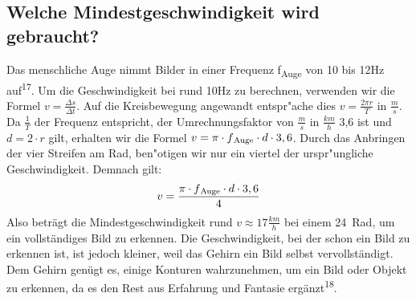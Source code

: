 \documentclass [a4paper, 11pt] {article}
\begin{document}
\subsection{Welche Mindestgeschwindigkeit wird gebraucht?}
Das menschliche Auge nimmt Bilder in einer Frequenz f\textsubscript{Auge} von 10 bis 12Hz auf\textsuperscript{17}. Um die Geschwindigkeit bei rund 10Hz zu berechnen, verwenden wir die Formel $v = \frac{\Delta s}{\Delta t}$. Auf die Kreisbewegung angewandt entspr"ache dies $v = \frac{2\pi r}{T}$ in $\frac{m}{s}$. Da $\frac{1}{T}$ der Frequenz entspricht, der Umrechnungsfaktor von $\frac{m}{s}$ in $\frac{km}{h}$ 3,6 ist und $d = 2 \cdot r$ gilt, erhalten wir die Formel $v = \pi \cdot f\textsubscript{Auge} \cdot d \cdot 3,6$. Durch das Anbringen der vier Streifen am Rad, ben"otigen wir nur ein viertel der urspr"ungliche Geschwindigkeit. Demnach gilt: 
\begin{align}
v = \frac{\pi \cdot f\textsubscript{Auge} \cdot d \cdot 3,6}{4}
\end{align}
Also beträgt die Mindestgeschwindigkeit rund $v \approx 17\frac{km}{h}$ bei einem 24\grqq\ Rad, um ein vollständiges Bild zu erkennen. Die Geschwindigkeit, bei der schon ein Bild zu erkennen ist, ist jedoch kleiner, weil das Gehirn ein Bild selbst vervollständigt. Dem Gehirn genügt es, einige Konturen wahrzunehmen, um ein Bild oder Objekt zu erkennen, da es den Rest aus Erfahrung und Fantasie ergänzt\textsuperscript{18}.
\end{document}
